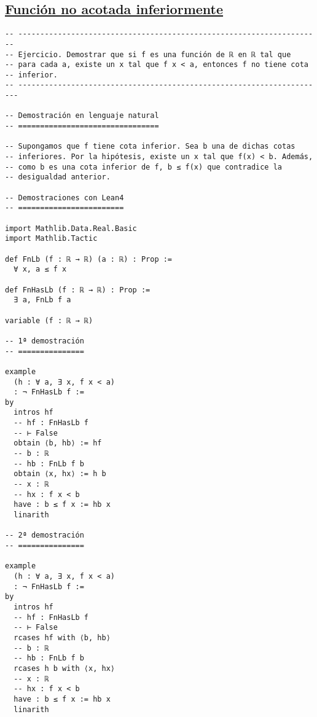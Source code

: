 \subsection{\href{./src/Logica/Funcion\_no\_acotada\_inferiormente.lean}{Función no acotada inferiormente}}
\label{sec:org360d296}
\begin{verbatim}
-- ---------------------------------------------------------------------
-- Ejercicio. Demostrar que si f es una función de ℝ en ℝ tal que
-- para cada a, existe un x tal que f x < a, entonces f no tiene cota
-- inferior.
-- ----------------------------------------------------------------------

-- Demostración en lenguaje natural
-- ================================

-- Supongamos que f tiene cota inferior. Sea b una de dichas cotas
-- inferiores. Por la hipótesis, existe un x tal que f(x) < b. Además,
-- como b es una cota inferior de f, b ≤ f(x) que contradice la
-- desigualdad anterior.

-- Demostraciones con Lean4
-- ========================

import Mathlib.Data.Real.Basic
import Mathlib.Tactic

def FnLb (f : ℝ → ℝ) (a : ℝ) : Prop :=
  ∀ x, a ≤ f x

def FnHasLb (f : ℝ → ℝ) : Prop :=
  ∃ a, FnLb f a

variable (f : ℝ → ℝ)

-- 1ª demostración
-- ===============

example
  (h : ∀ a, ∃ x, f x < a)
  : ¬ FnHasLb f :=
by
  intros hf
  -- hf : FnHasLb f
  -- ⊢ False
  obtain ⟨b, hb⟩ := hf
  -- b : ℝ
  -- hb : FnLb f b
  obtain ⟨x, hx⟩ := h b
  -- x : ℝ
  -- hx : f x < b
  have : b ≤ f x := hb x
  linarith

-- 2ª demostración
-- ===============

example
  (h : ∀ a, ∃ x, f x < a)
  : ¬ FnHasLb f :=
by
  intros hf
  -- hf : FnHasLb f
  -- ⊢ False
  rcases hf with ⟨b, hb⟩
  -- b : ℝ
  -- hb : FnLb f b
  rcases h b with ⟨x, hx⟩
  -- x : ℝ
  -- hx : f x < b
  have : b ≤ f x := hb x
  linarith
\end{verbatim}

